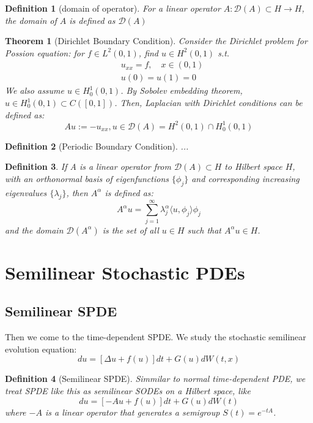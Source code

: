 \documentclass{article}
\newtheorem{theorem}{Theorem}
\newtheorem{definition}{Definition}
\begin{document}
\begin{definition}[domain of operator]
    For a linear operator $A:\mathcal{D}(A)\subset H\rightarrow H$, the domain of $A$ is defined as $\mathcal{D}(A)$
\end{definition}
\begin{theorem}[Dirichlet Boundary Condition]
    Consider the Dirichlet problem for Possion equation: for $f\in L^2(0, 1)$, find $u\in H^2(0, 1)$ s.t.
    \begin{equation}
        \begin{aligned}
            &u_{xx} = f, \quad x\in (0, 1)\\
            &u(0) = u(1) = 0
        \end{aligned}
    \end{equation}
    We also assume $u\in H^1_0(0, 1)$. By Sobolev embedding theorem, $u\in H^1_0(0, 1)\subset C([0, 1])$. 
    Then, Laplacian with Dirichlet conditions can be defined as:
    \begin{equation}
        Au:=-u_{xx}, u\in \mathcal{D}(A)=H^2(0,1)\cap H_0^1(0,1)
    \end{equation}
\end{theorem}


\begin{definition}[Periodic Boundary Condition]
    ...
\end{definition}

\begin{definition}
    If A is a linear operator from $\mathcal{D}(A) \subset H$ to Hilbert space $H$, with an orthonormal basis of eigenfunctions $\{\phi_j\}$ 
    and corresponding increasing eigenvalues $\{\lambda_j\}$, 
    then $A^{\alpha}$ is defined as:
    \begin{equation}
        A^{\alpha}u = \sum_{j=1}^\infty \lambda_j^\alpha \langle u, \phi_j\rangle \phi_j
    \end{equation}
    and the domain $\mathcal{D}(A^{\alpha})$ is the set of all $u\in H$ such that $A^{\alpha}u\in H$.
\end{definition}




\section{Semilinear Stochastic PDEs}
\subsection{Semilinear SPDE}
Then we come to the time-dependent SPDE. We study the stochastic semilinear evolution equation:
\begin{equation}
    du = [\Delta u + f(u)]dt + G(u)dW(t, x)
\end{equation}
\begin{definition}[Semilinear SPDE]
    Simmilar to normal time-dependent PDE, we treat SPDE like this as semilinear SODEs on a Hilbert space, like
\begin{equation}
    du = [-Au+f(u)]dt + G(u)dW(t)
\end{equation}
where $-A$ is a linear operator that generates a semigroup $S(t)=e^{-tA}$. 
\end{definition}
\end{document}
